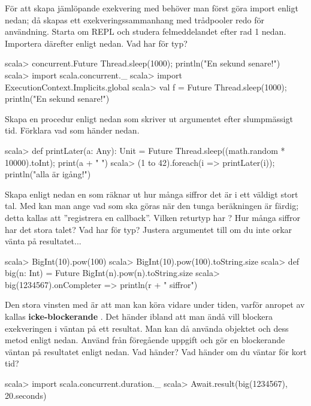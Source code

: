 \Subtask För att skapa jämlöpande exekvering med  behöver man först göra import enligt nedan; då skapas ett exekveringssammanhang med trådpooler redo för användning. Starta om REPL och studera felmeddelandet efter rad 1 nedan. Importera därefter enligt nedan. Vad har  för typ? 
\begin{REPL}
scala> concurrent.Future { Thread.sleep(1000); println("En sekund senare!") }
scala> import scala.concurrent._ 
scala> import ExecutionContext.Implicits.global
scala> val f = Future { Thread.sleep(1000); println("En sekund senare!") }
\end{REPL}

\Subtask Skapa en procedur  enligt nedan som skriver ut argumentet efter slumpmässigt tid. Förklara vad som händer nedan.
\begin{REPL}
scala> def printLater(a: Any): Unit =  
         Future { Thread.sleep((math.random * 10000).toInt); print(a + " ") }
scala> (1 to 42).foreach(i => printLater(i)); println("alla är igång!")
\end{REPL}

\Subtask Skapa enligt nedan en  som räknar ut hur många siffror det är i ett väldigt stort tal. Med  kan man ange vad som ska göras när den tunga beräkningen är färdig; detta kallas att ''registrera en callback''. Vilken returtyp har ? Hur många siffror har det stora talet? Vad har  för typ? Justera argumentet till  om du inte orkar vänta på resultatet...

\begin{REPL}
scala> BigInt(10).pow(100)
scala> BigInt(10).pow(100).toString.size
scala> def big(n: Int) = Future { BigInt(n).pow(n).toString.size }
scala> big(1234567).onComplete{r => println(r + " siffror") }
\end{REPL} 

\Subtask Den stora vinsten med  är att man kan köra vidare under tiden, varför anropet av  kallas \textbf{icke-blockerande} . Det händer ibland att man ändå vill blockera exekveringen i väntan på ett resultat. Man kan då använda objektet  och dess metod  enligt nedan. Använd  från föregående uppgift och gör en blockerande väntan på resultatet enligt nedan. Vad händer? Vad händer om du väntar för kort tid?

\begin{REPL}
scala> import scala.concurrent.duration._
scala> Await.result(big(1234567), 20.seconds)
\end{REPL} 



